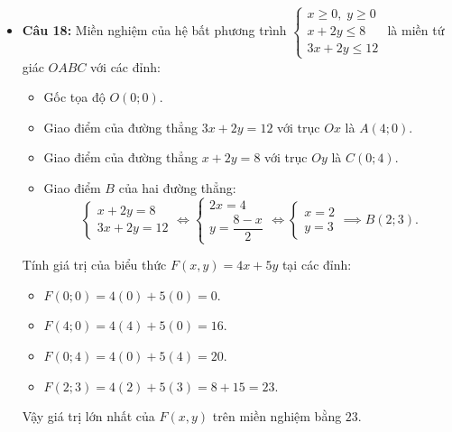 \documentclass[12pt,a4paper]{article}
\begin{document}
\begin{itemize}[leftmargin=0.6cm, itemsep=1.5pt, topsep=1pt]
    \item \textbf{Câu 18:} Miền nghiệm của hệ bất phương trình $\begin{cases} x \ge 0,\; y \ge 0 \\ x + 2y \le 8 \\ 3x + 2y \le 12 \end{cases}$ là miền tứ giác $OABC$ với các đỉnh:
    \begin{itemize}[itemsep=1pt]
        \item Gốc tọa độ $O(0; 0)$.
        \item Giao điểm của đường thẳng $3x + 2y = 12$ với trục $Ox$ là $A(4; 0)$.
        \item Giao điểm của đường thẳng $x + 2y = 8$ với trục $Oy$ là $C(0; 4)$.
        \item Giao điểm $B$ của hai đường thẳng:
        \[
        \begin{cases} x + 2y = 8 \\ 3x + 2y = 12 \end{cases} \iff \begin{cases} 2x = 4 \\ y = \dfrac{8 - x}{2} \end{cases} \iff \begin{cases} x = 2 \\ y = 3 \end{cases} \implies B(2; 3).
        \]
    \end{itemize}
    Tính giá trị của biểu thức $F(x, y) = 4x + 5y$ tại các đỉnh:
    \begin{itemize}[itemsep=1pt]
        \item $F(0; 0) = 4(0) + 5(0) = 0$.
        \item $F(4; 0) = 4(4) + 5(0) = 16$.
        \item $F(0; 4) = 4(0) + 5(4) = 20$.
        \item $F(2; 3) = 4(2) + 5(3) = 8 + 15 = 23$.
    \end{itemize}
    Vậy giá trị lớn nhất của $F(x, y)$ trên miền nghiệm bằng $23$.
\end{itemize}
\end{document}
